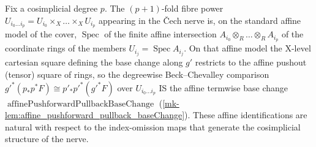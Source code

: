 \begin{lemma}\label{mk-lem:cech_degree_affine_baseChange}
  \leanok

  Fix a cosimplicial degree \(p\). The \((p+1)\)-fold fibre power
  \(U_{i_0\dots i_p} = U_{i_0} \times_X \dots \times_X U_{i_p}\) appearing in the
  {\v C}ech nerve is, on the standard affine model of the cover, \(\operatorname{Spec}\)
  of the finite affine intersection \(A_{i_0} \otimes_R \dots \otimes_R A_{i_p}\) of the
  coordinate rings of the members \(U_{i_j} = \operatorname{Spec} A_{i_j}\). On that
  affine model the X-level cartesian square defining the base change along \(g'\)
  restricts to the affine pushout (tensor) square of rings, so the degreewise
  Beck--Chevalley comparison
  \(g'^*(p_* p^* F) \cong p'_* p'^*(g'^* F)\) over \(U_{i_0\dots i_p}\) IS the affine
  termwise base change \(\operatorname{affinePushforwardPullbackBaseChange}\)
  (\ref{mk-lem:affine_pushforward_pullback_baseChange}). These affine identifications are
  natural with respect to the index-omission maps that generate the cosimplicial
  structure of the nerve.
\end{lemma}

